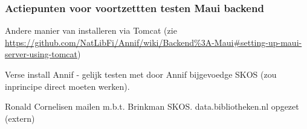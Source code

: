 \documentclass{article}
\begin{document}
  
\subsubsection{Actiepunten voor voortzettten testen Maui backend}
\begin{todolist}
  \item Andere manier van installeren via Tomcat (zie \url{https://github.com/NatLibFi/Annif/wiki/Backend\%3A-Maui#setting-up-maui-server-using-tomcat})
  \item Verse install Annif - gelijk testen met door Annif bijgevoedge SKOS (zou inprincipe direct moeten werken).
  \item Ronald Cornelisen mailen m.b.t. Brinkman SKOS. data.bibliotheken.nl opgezet (extern)
\end{todolist}
\end{document}
